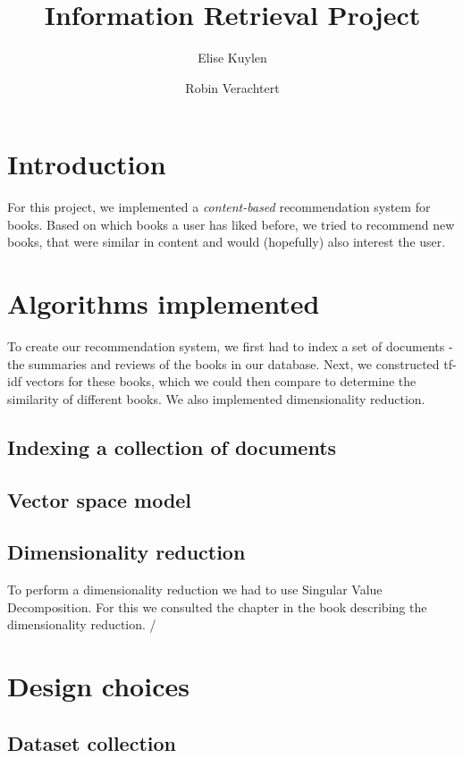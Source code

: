 \documentclass[10pt,a4paper]{paper}
\author{Elise Kuylen \and Robin Verachtert}
\title{Information Retrieval Project}
\begin{document}
\maketitle

\section{Introduction}

For this project, we implemented a \textit{content-based} recommendation system for books. Based on which books a user has liked before, we tried to recommend new books, that were similar in content and would (hopefully) also interest the user.

\section{Algorithms implemented}

To create our recommendation system, we first had to index a set of documents - the summaries and reviews of the books in our database. Next, we constructed tf-idf vectors for these books, which we could then compare to determine the similarity of different books. We also implemented dimensionality reduction. %

\subsection{Indexing a collection of documents}

\subsection{Vector space model}

\subsection{Dimensionality reduction}
To perform a dimensionality reduction we had to use Singular Value Decomposition. For this we consulted the chapter in the book describing the dimensionality reduction. / %

\section{Design choices}

\subsection{Dataset collection}
\end{document}
